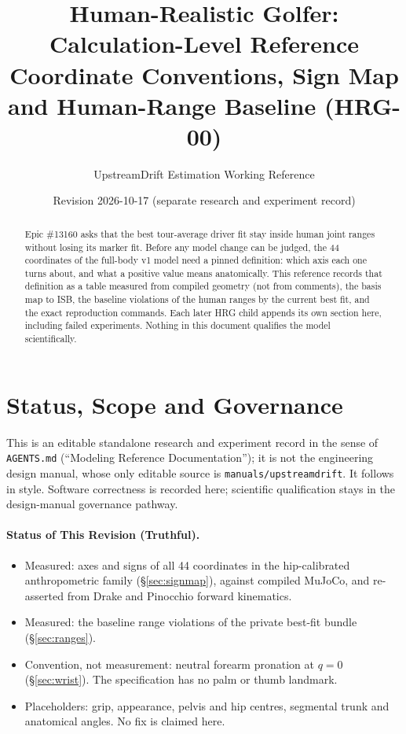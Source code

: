 \documentclass[11pt,a4paper]{article}
\title{Human-Realistic Golfer: Calculation-Level Reference\\[4pt]
\large Coordinate Conventions, Sign Map and Human-Range Baseline (HRG-00)}
\author{UpstreamDrift Estimation Working Reference}
\date{Revision 2026-10-17 \quad (separate research and experiment record)}
\begin{document}
\maketitle

\begin{abstract}
Epic \#13160 asks that the best tour-average driver fit stay inside human
joint ranges without losing its marker fit.  Before any model change can be
judged, the 44 coordinates of the full-body v1 model need a pinned definition:
which axis each one turns about, and what a positive value means anatomically.
This reference records that definition as a table measured from compiled
geometry (not from comments), the basis map to ISB, the baseline violations of
the human ranges by the current best fit, and the exact reproduction commands.
Each later HRG child appends its own section here, including failed
experiments.  Nothing in this document qualifies the model scientifically.
\end{abstract}

\tableofcontents

\section{Status, Scope and Governance}

This is an editable standalone research and experiment record in the sense of
\texttt{AGENTS.md} (``Modeling Reference Documentation''); it is not the
engineering design manual, whose only editable source is
\texttt{manuals/upstreamdrift}.  It follows
 in
style.  Software correctness is recorded here; scientific qualification stays
in the design-manual governance pathway.

\paragraph{Status of This Revision (Truthful).}
\begin{itemize}[nosep]
  \item Measured: axes and signs of all 44 coordinates in the
    hip-calibrated anthropometric family (\S\ref{sec:signmap}), against
    compiled MuJoCo, and re-asserted from Drake and Pinocchio forward
    kinematics.
  \item Measured: the baseline range violations of the private best-fit
    bundle (\S\ref{sec:ranges}).
  \item Convention, not measurement: neutral forearm pronation at $q=0$
    (\S\ref{sec:wrist}).  The specification has no palm or thumb landmark.
  \item Placeholders: grip, appearance, pelvis and hip centres, segmental trunk
    and anatomical angles.  No fix is claimed here.
\end{itemize}
\end{document}
